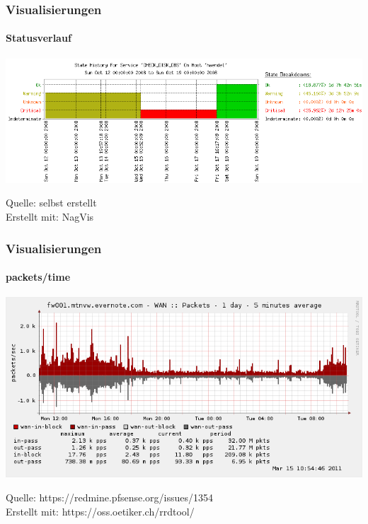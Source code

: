 \begin{frame}
\frametitle{Visualisierungen}
\framesubtitle{Statusverlauf}

    \includegraphics[scale=0.45]{img/nag_trend.png}
    \vspace{0.5cm}
    
    \footnoterule
    \footnotesize{
        Quelle:          selbst erstellt\\
        Erstellt mit:    NagVis}

\end{frame}
\begin{frame}
\frametitle{Visualisierungen}
\framesubtitle{packets/time}

\includegraphics[scale=0.4]{img/status_rrd_graph_img.png}
\vspace{0.5cm}

\footnoterule
\footnotesize{
   Quelle:          https://redmine.pfsense.org/issues/1354\\
   Erstellt mit:    https://oss.oetiker.ch/rrdtool/}


\end{frame}